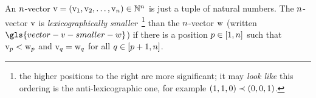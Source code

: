 
An $n$-vector $\mathrm{v} = (\mathrm{v}_{1}, \mathrm{v}_{2}, \dots, \mathrm{v}_{n}) \in
\mathbb{N}^{n}$ is just a tuple of natural numbers.
The $n$-vector $\mathrm{v}$ is \emph{lexicographically smaller}~\footnote{the
higher positions to the right are more significant; it may \emph{look like} this
ordering is the anti-lexicographic one, for example $(1,1,0) \prec (0,0,1)$.} than the
$n$-vector $\mathrm{w}$ (written $\gls{vector-v-smaller-w}$) if there is a position $p \in [1, n]$ such that $\mathrm{v}_{p} < \mathrm{w}_{p}$ and $\mathrm{v}_{q} = \mathrm{w}_{q}$ for all $q \in [p+1, n]$.
